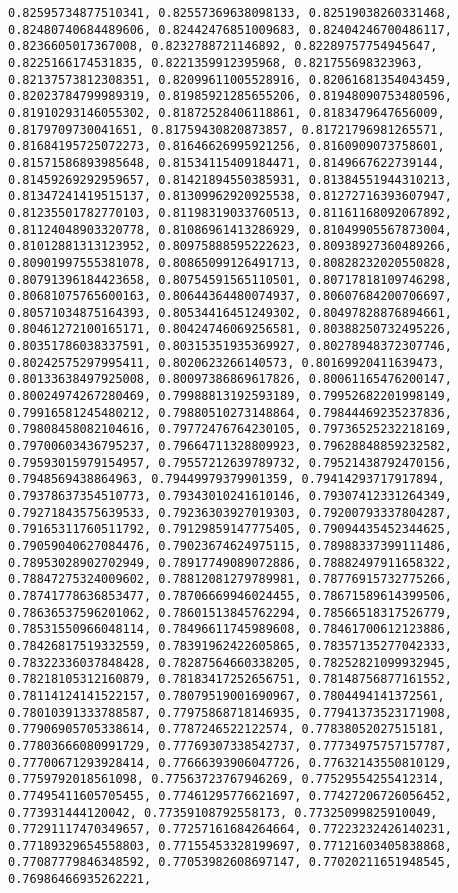 \documentclass[11pt]{article}
\begin{document}
\begin{Verbatim}[commandchars=\\\{\}]
0.82595734877510341, 0.82557369638098133, 0.82519038260331468, 0.82480740684489606, 0.82442476851009683, 0.82404246700486117, 0.8236605017367008, 0.8232788721146892, 0.82289757754945647, 0.8225166174531835, 0.8221359912395968, 0.821755698323963, 0.82137573812308351, 0.82099611005528916, 0.82061681354043459, 0.82023784799989319, 0.81985921285655206, 0.81948090753480596, 0.81910293146055302, 0.81872528406118861, 0.8183479647656009, 0.8179709730041651, 0.81759430820873857, 0.81721796981265571, 0.81684195725072273, 0.81646626995921256, 0.8160909073758601, 0.81571586893985648, 0.81534115409184471, 0.8149667622739144, 0.81459269292959657, 0.81421894550385931, 0.81384551944310213, 0.81347241419515137, 0.81309962920925538, 0.81272716393607947, 0.81235501782770103, 0.81198319033760513, 0.81161168092067892, 0.81124048903320778, 0.81086961413286929, 0.81049905567873004, 0.81012881313123952, 0.80975888595222623, 0.80938927360489266, 0.80901997555381078, 0.80865099126491713, 0.80828232020550828, 0.80791396184423658, 0.80754591565110501, 0.80717818109746298, 0.80681075765600163, 0.80644364480074937, 0.80607684200706697, 0.80571034875164393, 0.80534416451249302, 0.80497828876894661, 0.80461272100165171, 0.80424746069256581, 0.80388250732495226, 0.80351786038337591, 0.80315351935369927, 0.80278948372307746, 0.80242575297995411, 0.8020623266140573, 0.80169920411639473, 0.80133638497925008, 0.80097386869617826, 0.80061165476200147, 0.80024974267280469, 0.79988813192593189, 0.79952682201998149, 0.79916581245480212, 0.79880510273148864, 0.79844469235237836, 0.79808458082104616, 0.79772476764230105, 0.79736525232218169, 0.79700603436795237, 0.79664711328809923, 0.79628848859232582, 0.79593015979154957, 0.79557212639789732, 0.79521438792470156, 0.7948569438864963, 0.79449979379901359, 0.79414293717917894, 0.79378637354510773, 0.79343010241610146, 0.79307412331264349, 0.79271843575639533, 0.79236303927019303, 0.79200793337804287, 0.79165311760511792, 0.79129859147775405, 0.79094435452344625, 0.79059040627084476, 0.79023674624975115, 0.78988337399111486, 0.78953028902702949, 0.78917749089072886, 0.78882497911658322, 0.78847275324009602, 0.78812081279789981, 0.78776915732775266, 0.78741778636853477, 0.78706669946024455, 0.78671589614399506, 0.78636537596201062, 0.78601513845762294, 0.78566518317526779, 0.78531550966048114, 0.78496611745989608, 0.78461700612123886, 0.78426817519332559, 0.78391962422605865, 0.78357135277042333, 0.78322336037848428, 0.78287564660338205, 0.78252821099932945, 0.78218105312160879, 0.78183417252656751, 0.78148756877161552, 0.78114124141522157, 0.78079519001690967, 0.7804494141372561, 0.78010391333788587, 0.77975868718146935, 0.77941373523171908, 0.77906905705338614, 0.7787246522122574, 0.77838052027515181, 0.77803666080991729, 0.77769307338542737, 0.77734975757157787, 0.77700671293928414, 0.77666393906047726, 0.77632143550810129, 0.7759792018561098, 0.77563723767946269, 0.77529554255412314, 0.77495411605705455, 0.77461295776621697, 0.77427206726056452, 0.773931444120042, 0.77359108792558173, 0.77325099825910049, 0.77291117470349657, 0.77257161684264664, 0.77223232426140231, 0.77189329654558803, 0.77155453328199697, 0.77121603405838868, 0.77087779846348592, 0.77053982608697147, 0.77020211651948545, 0.76986466935262221, 
\end{Verbatim}
\end{document}
